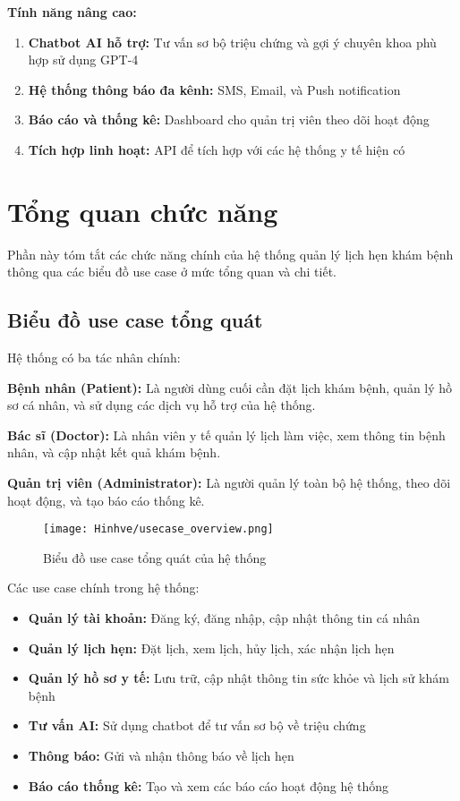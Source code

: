 \documentclass[../DoAn.tex]{subfiles}
\begin{document}
\textbf{Tính năng nâng cao:}
\begin{enumerate}
    \item \textbf{Chatbot AI hỗ trợ:} Tư vấn sơ bộ triệu chứng và gợi ý chuyên khoa phù hợp sử dụng GPT-4
    \item \textbf{Hệ thống thông báo đa kênh:} SMS, Email, và Push notification
    \item \textbf{Báo cáo và thống kê:} Dashboard cho quản trị viên theo dõi hoạt động
    \item \textbf{Tích hợp linh hoạt:} API để tích hợp với các hệ thống y tế hiện có
\end{enumerate}

\section{Tổng quan chức năng}
\label{section:2.2}

Phần này tóm tắt các chức năng chính của hệ thống quản lý lịch hẹn khám bệnh thông qua các biểu đồ use case ở mức tổng quan và chi tiết.

\subsection{Biểu đồ use case tổng quát}
\label{subsection:2.2.1}

Hệ thống có ba tác nhân chính:

\textbf{Bệnh nhân (Patient):} Là người dùng cuối cần đặt lịch khám bệnh, quản lý hồ sơ cá nhân, và sử dụng các dịch vụ hỗ trợ của hệ thống.

\textbf{Bác sĩ (Doctor):} Là nhân viên y tế quản lý lịch làm việc, xem thông tin bệnh nhân, và cập nhật kết quả khám bệnh.

\textbf{Quản trị viên (Administrator):} Là người quản lý toàn bộ hệ thống, theo dõi hoạt động, và tạo báo cáo thống kê.

\begin{figure}[H]
    \centering
    \texttt{[image: Hinhve/usecase\_overview.png]}
    \caption{Biểu đồ use case tổng quát của hệ thống}
    \label{fig:usecase_overview}
\end{figure}

Các use case chính trong hệ thống:
\begin{itemize}
    \item \textbf{Quản lý tài khoản:} Đăng ký, đăng nhập, cập nhật thông tin cá nhân
    \item \textbf{Quản lý lịch hẹn:} Đặt lịch, xem lịch, hủy lịch, xác nhận lịch hẹn
    \item \textbf{Quản lý hồ sơ y tế:} Lưu trữ, cập nhật thông tin sức khỏe và lịch sử khám bệnh
    \item \textbf{Tư vấn AI:} Sử dụng chatbot để tư vấn sơ bộ về triệu chứng
    \item \textbf{Thông báo:} Gửi và nhận thông báo về lịch hẹn
    \item \textbf{Báo cáo thống kê:} Tạo và xem các báo cáo hoạt động hệ thống
\end{itemize}
\end{document}
